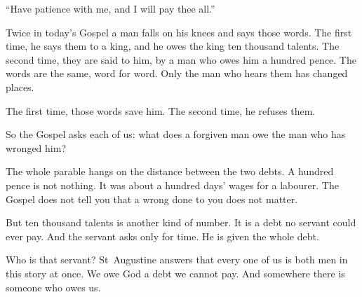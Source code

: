 \raggedcolumns

``Have patience with me, and I will pay thee all.''

Twice in today's Gospel a man falls on his knees and says those words. The
first time, he says them to a king, and he owes the king ten thousand talents.
The second time, they are said to him, by a man who owes him a hundred pence.
The words are the same, word for word. Only the man who hears them has changed
places.

The first time, those words save him. The second time, he refuses them.

So the Gospel asks each of us: what does a forgiven man owe the man who has
wronged him?

\medskip

The whole parable hangs on the distance between the two debts. A hundred
pence is not nothing. It was about a hundred days' wages for a
labourer. The Gospel does not tell you that a wrong done to you does not
matter.

But ten thousand talents is another kind of number. It is a debt no servant
could ever pay. And the servant asks only for time. He is given the whole
debt.

Who is that servant? St~Augustine answers that every one of us is both men in
this story at once. We owe God a debt we cannot pay. And somewhere there is
someone who owes us.

